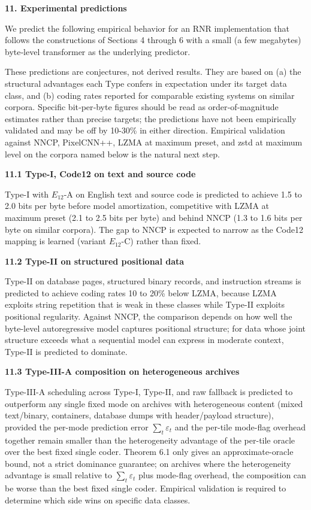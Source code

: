 \documentclass[
]{article}
\begin{document}
\textbf{11. Experimental predictions}

We predict the following empirical behavior for an RNR implementation
that follows the constructions of Sections 4 through 6 with a small (a
few megabytes) byte‑level transformer as the underlying predictor.

These predictions are conjectures, not derived results. They are based
on (a) the structural advantages each Type confers in expectation under
its target data class, and (b) coding rates reported for comparable
existing systems on similar corpora. Specific bit‑per‑byte figures
should be read as order‑of‑magnitude estimates rather than precise
targets; the predictions have not been empirically validated and may be
off by 10-30\% in either direction. Empirical validation against NNCP,
PixelCNN++, LZMA at maximum preset, and zstd at maximum level on the
corpora named below is the natural next step.

\textbf{11.1 Type-I, Code12 on text and source code}

Type-I with $E_{12}$-A on English text and source code is predicted
to achieve 1.5 to 2.0 bits per byte before model amortization,
competitive with LZMA at maximum preset (2.1 to 2.5 bits per byte)
and behind NNCP (1.3 to 1.6 bits per byte on similar corpora). The
gap to NNCP is expected to narrow as the Code12 mapping is learned
(variant $E_{12}$-C) rather than fixed.

\textbf{11.2 Type-II on structured positional data}

Type-II on database pages, structured binary records, and instruction
streams is predicted to achieve coding rates 10 to 20\% below LZMA,
because LZMA exploits string repetition that is weak in these classes
while Type-II exploits positional regularity. Against NNCP, the
comparison depends on how well the byte-level autoregressive model
captures positional structure; for data whose joint structure exceeds
what a sequential model can express in moderate context, Type-II is
predicted to dominate.

\textbf{11.3 Type-III-A composition on heterogeneous archives}

Type-III-A scheduling across Type-I, Type-II, and raw fallback is
predicted to outperform any single fixed mode on archives with
heterogeneous content (mixed text/binary, containers, database
dumps with header/payload structure), provided the per-mode
prediction error $\sum_t \varepsilon_t$ and the per-tile mode-flag
overhead together remain smaller than the heterogeneity advantage
of the per-tile oracle over the best fixed single coder.
Theorem 6.1 only gives an approximate-oracle bound, not a strict
dominance guarantee; on archives where the heterogeneity advantage
is small relative to $\sum_t \varepsilon_t$ plus mode-flag
overhead, the composition can be worse than the best fixed single
coder. Empirical validation is required to determine which side
wins on specific data classes.
\end{document}
